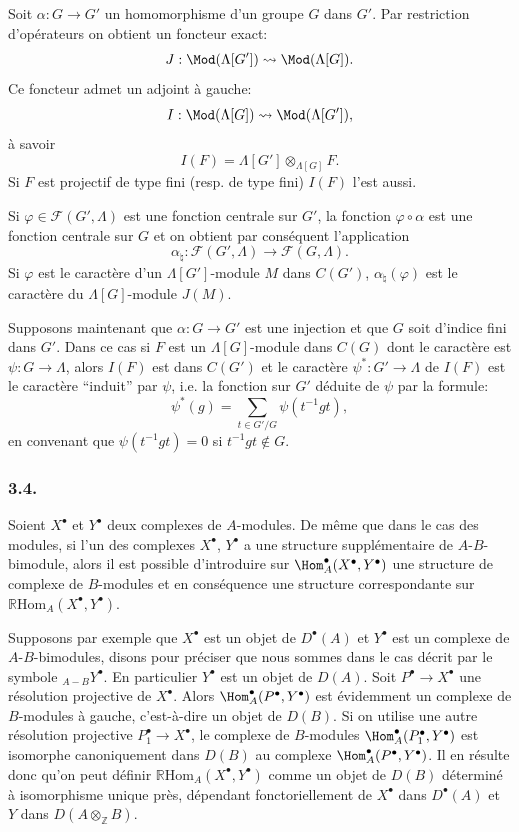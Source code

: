 Soit $\alpha:G\to G'$ un homomorphisme d'un groupe $G$ dans $G'$. Par restriction d'opérateurs on obtient un foncteur exact:
\[
J:\Mod(\Lambda[G'])\rightsquigarrow\Mod(\Lambda[G]).
\]
Ce foncteur admet un adjoint à gauche:
\[
I:\Mod(\Lambda[G])\rightsquigarrow\Mod(\Lambda[G']),
\]
à savoir
\[
I(F)=\Lambda[G']\otimes_{\Lambda[G]}F.
\]
Si $F$ est projectif de type fini (resp. de type fini) $I(F)$ l'est aussi.

Si $\varphi\in\mathcal{F}(G',\Lambda)$ est une fonction centrale sur $G'$, la fonction $\varphi\circ\alpha$ est une fonction centrale sur $G$ et on obtient par conséquent l'application
\[
\alpha_\natural: \mathcal{F}(G',\Lambda)\longrightarrow\mathcal{F}(G,\Lambda).
\]
Si $\varphi$ est le caractère d'un $\Lambda[G']$-module $M$ dans $C(G')$, $\alpha_\natural(\varphi)$ est le caractère du $\Lambda[G]$-module $J(M)$.

Supposons maintenant que $\alpha:G\to G'$ est une injection et que $G$ soit d'indice fini dans $G'$. Dans ce cas si $F$ est un $\Lambda[G]$-module dans $C(G)$ dont le caractère est $\psi:G\to\Lambda$, alors $I(F)$ est dans $C(G')$ et le caractère $\psi^*:G'\to\Lambda$ de $I(F)$ est le caractère ``induit'' par $\psi$, i.e. la fonction sur $G'$ déduite de $\psi$ par la formule:
\[
\psi^*(g)=\sum_{t\in G'/G}\psi(t^{-1}gt),
\tag{3.3.1}
\]
en
convenant que $\psi(t^{-1}gt)=0$ si $t^{-1}gt\notin G$.

\subsubsection*{3.4.}

Soient $X^\bullet$ et $Y^\bullet$ deux complexes de $A$-modules. De même que dans le cas des modules, si l'un des complexes $X^\bullet$, $Y^\bullet$ a une structure supplémentaire de $A$-$B$-bimodule, alors il est possible d'introduire sur $\Hom_A^\bullet(X^\bullet,Y^\bullet)$ une structure de complexe de $B$-modules et en conséquence une structure correspondante sur $\mathbb{R}\mathrm{Hom}_A(X^\bullet,Y^\bullet)$.

Supposons par exemple que $X^\bullet$ est un objet de $D^\bullet(A)$ et $Y^\bullet$ est un complexe de $A$-$B$-bimodules, disons pour préciser que nous sommes dans le cas décrit par le symbole ${}_{A-B}Y^\bullet$. En particulier $Y^\bullet$ est un objet de $D(A)$. Soit $P^\bullet\to X^\bullet$ une résolution projective de $X^\bullet$. Alors $\Hom_A^\bullet(P^\bullet,Y^\bullet)$ est évidemment un complexe de $B$-modules à gauche, c'est-à-dire un objet de $D(B)$. Si on utilise une autre résolution projective $P_1^\bullet\to X^\bullet$, le complexe de $B$-modules $\Hom_A^\bullet(P_1^\bullet,Y^\bullet)$ est isomorphe canoniquement dans $D(B)$ au complexe $\Hom_A^\bullet(P^\bullet,Y^\bullet)$. Il en résulte donc qu'on peut définir $\mathbb{R}\mathrm{Hom}_A(X^\bullet,Y^\bullet)$ comme un objet de $D(B)$ déterminé à isomorphisme unique près, dépendant fonctoriellement de $X^\bullet$ dans $D^\bullet(A)$ et $Y$ dans $D(A\otimes_{\mathbb{Z}}B)$.

